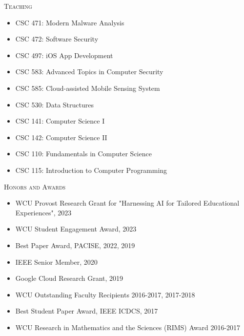 \documentclass[letter]{article}
\newenvironment{tightitem}
{\begin{itemize}
\setlength{\itemsep}{1pt}
\setlength{\parskip}{0pt}
\setlength{\parsep}{0pt}}
{\end{itemize}}
\newcommand{\heading}[1]{\item \large \textsc{#1} \normalsize}
\begin{document}
\begin{description}
\heading{Teaching}
\begin{itemize}
\item CSC 471: Modern Malware Analysis
\item CSC 472: Software Security
\item CSC 497: iOS App Development
\item CSC 583: Advanced Topics in Computer Security
\item CSC 585: Cloud-assisted Mobile Sensing System
\item CSC 530: Data Structures
\item CSC 141: Computer Science I
\item CSC 142: Computer Science II
\item CSC 110: Fundamentals in Computer Science
\item CSC 115: Introduction to Computer Programming
\end{itemize}

\heading{Honors and Awards}

\begin{tightitem}

\item WCU Provost Research Grant for "Harnessing AI for Tailored Educational Experiences", 2023
\item WCU Student Engagement Award, 2023
\item Best Paper Award, PACISE, 2022, 2019
\item IEEE Senior Member, 2020
\item Google Cloud Research Grant, 2019
\item WCU Outstanding Faculty Recipients 2016-2017, 2017-2018
\item Best Student Paper Award, IEEE ICDCS, 2017
\item WCU Research in Mathematics and the Sciences (RIMS) Award 2016-2017

\end{tightitem}

\end{description}
\end{document}
